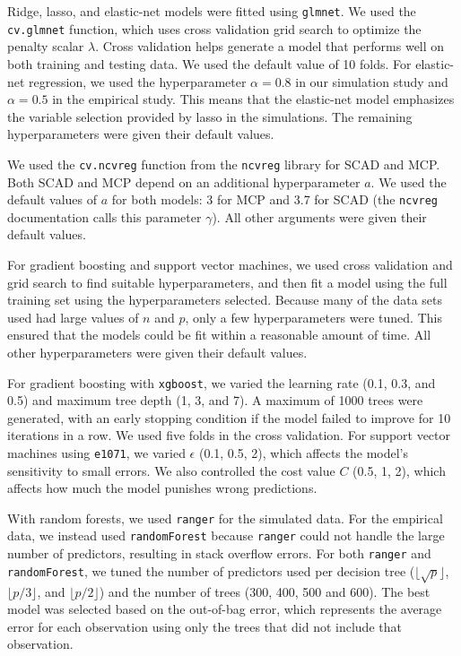 \documentclass{article}
\begin{document}
	Ridge, lasso, and elastic-net models were fitted using \lstinline!glmnet!. We used the \lstinline!cv.glmnet! function, which uses cross validation grid search to optimize the penalty scalar $\lambda$. Cross validation helps generate a model that performs well on both training and testing data. We used the default value of 10 folds. For elastic-net regression, we used the hyperparameter $\alpha = 0.8$ in our simulation study and $\alpha = 0.5$ in the empirical study. This means that the elastic-net model emphasizes the variable selection provided by lasso in the simulations. The remaining hyperparameters were given their default values.
	
	We used the \lstinline!cv.ncvreg! function from the \lstinline!ncvreg! library for SCAD and MCP. Both SCAD and MCP depend on an additional hyperparameter $a$. We used the default values of $a$ for both models: 3 for MCP and 3.7 for SCAD (the \lstinline!ncvreg! documentation calls this parameter $\gamma$). All other arguments were given their default values. 
	
	For gradient boosting and support vector machines, we used cross validation and grid search to find suitable hyperparameters, and then fit a model using the full training set using the hyperparameters selected. Because many of the data sets used had large values of $n$ and $p$, only a few hyperparameters were tuned. This ensured that the models could be fit within a reasonable amount of time. All other hyperparameters were given their default values.
	
	For gradient boosting with \lstinline!xgboost!, we varied the learning rate (0.1, 0.3, and 0.5) and maximum tree depth (1, 3, and 7). A maximum of 1000 trees were generated, with an early stopping condition if the model failed to improve for 10 iterations in a row. We used five folds in the cross validation. For support vector machines using \lstinline!e1071!, we varied $\epsilon$ (0.1, 0.5, 2), which affects the model's sensitivity to small errors. We also controlled the cost value $C$ (0.5, 1, 2), which affects how much the model punishes wrong predictions.
	
	With random forests, we used \lstinline!ranger! for the simulated data. For the empirical data, we instead used \lstinline!randomForest! because \lstinline!ranger! could not handle the large number of predictors, resulting in stack overflow errors. For both \lstinline!ranger! and \lstinline!randomForest!, we tuned the number of predictors used per decision tree ($\lfloor \sqrt{p}\rfloor$, $\lfloor p / 3 \rfloor$, and $\lfloor p / 2 \rfloor$) and the number of trees (300, 400, 500 and 600). The best model was selected based on the out-of-bag error, which represents the average error for each observation using only the trees that did not include that observation.
	
\end{document}
